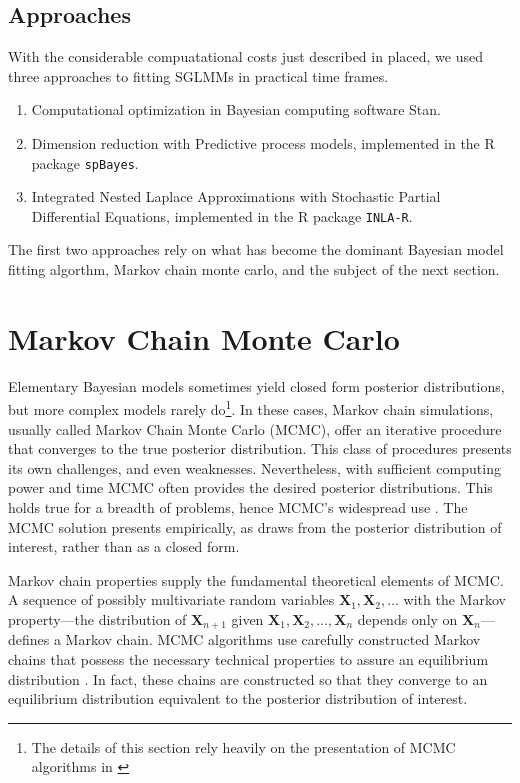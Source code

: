 \subsection{Approaches}
With the considerable compuatational costs just described in placed, we used three approaches to fitting SGLMMs in practical time frames.

\begin{enumerate}
\item Computational optimization in Bayesian computing software Stan.
\item Dimension reduction with Predictive process models, implemented in the R package \verb|spBayes|.
\item Integrated Nested Laplace Approximations with Stochastic Partial Differential Equations, implemented in the R package \verb|INLA-R|.
\end{enumerate}


The first two approaches rely on what has become the dominant Bayesian model fitting algorthm, Markov chain monte carlo, and the subject of the next section.

\section{Markov Chain Monte Carlo}

Elementary Bayesian models sometimes yield closed form posterior distributions, but more complex models rarely do\footnote{The details of this section rely heavily on the presentation of MCMC algorithms in \cite{Banerjee2014}}. In these cases, Markov chain simulations, usually called Markov Chain Monte Carlo (MCMC), offer an iterative procedure that converges to the true posterior distribution. This class of procedures presents its own challenges, and even weaknesses.  Nevertheless, with sufficient computing power and time MCMC often provides the desired posterior distributions. This holds true for a breadth of problems, hence MCMC's widespread use \cite{Banerjee2014}. The MCMC solution presents empirically, as draws from the posterior distribution of interest, rather than as a closed form. 

Markov chain properties supply the fundamental theoretical elements of MCMC. A sequence of possibly multivariate random variables $\pmb{X}_{1}, \pmb{X}_{2}, \hdots$ with the Markov property---the distribution of $\pmb{X}_{n+1}$ given $\pmb{X}_{1}, \pmb{X}_{2}, \hdots , \pmb{X}_{n}$ depends only on $\pmb{X}_{n}$---defines a Markov chain. MCMC algorithms use carefully constructed Markov chains that possess the necessary technical properties to assure an equilibrium distribution \citep{Brooks2011}. In fact, these chains are constructed so that they converge to an equilibrium distribution equivalent to the posterior distribution of interest.

